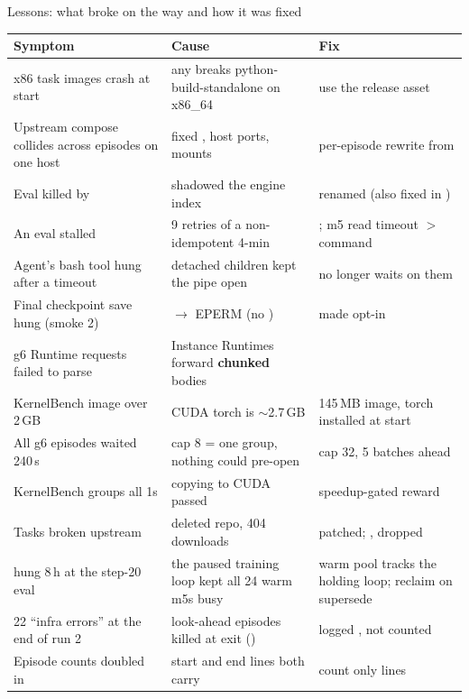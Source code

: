\begin{frame}{Lessons: what broke on the way and how it was fixed}
\tiny\setlength{\tabcolsep}{3pt}
\begin{tabularx}{\textwidth}{@{}P{0.30\textwidth}YY@{}}
\toprule
\textbf{Symptom} & \textbf{Cause} & \textbf{Fix}\\
\midrule
x86 task images crash at start & any  breaks python-build-standalone on x86\_64 & use the  release asset\\
Upstream compose collides across episodes on one host & fixed , host ports,  mounts & per-episode rewrite from \\
Eval killed by  &  shadowed the engine index & renamed (also fixed in )\\
An eval stalled & 9 retries of a non-idempotent 4-min  & ; m5 read timeout $>$ command\\
Agent's bash tool hung after a timeout & detached children kept the pipe open &  no longer waits on them\\
Final checkpoint save hung (smoke 2) &  $\rightarrow$  EPERM (no ) &  made opt-in\\
g6 Runtime requests failed to parse & Instance Runtimes forward \textbf{chunked} bodies & \\
KernelBench image over 2\,GB & CUDA torch is $\sim$2.7\,GB & 145\,MB image, torch installed at start\\
All g6 episodes waited 240\,s & cap 8 = one group, nothing could pre-open & cap 32, 5 batches ahead\\
KernelBench groups all 1s & copying  to CUDA passed & speedup-gated reward\\
Tasks broken upstream & deleted repo, 404 downloads &  patched; ,  dropped\\
 hung 8\,h at the step-20 eval & the paused training loop kept all 24 warm m5s busy & warm pool tracks the holding loop; reclaim on supersede\\
22 ``infra errors'' at the end of run 2 & look-ahead episodes killed at exit () & logged , not counted\\
Episode counts doubled in  & start and end lines both carry  & count only  lines\\
\bottomrule
\end{tabularx}
\end{frame}

